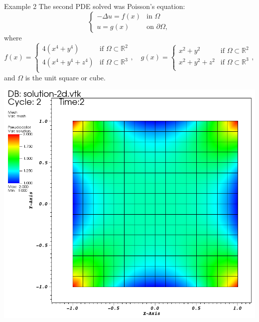 \documentclass[9pt]{beamer}
\newcommand{\Real}{\mathbb R}
\newcommand{\lap}{\Delta}
\begin{document}
\begin{frame}{Example 2}
The second PDE solved was Poisson's equation:
$$
\begin{cases}
-\lap u = f(x) &\text{in }\Omega\\
u = g(x) & \text{on }\partial\Omega,
\end{cases}
$$
where 
$$
f(x) = \begin{cases}
4(x^4 + y^4) & \text{if } \Omega \subset \Real^2\\
4(x^4 + y^4 + z^4) & \text{if } \Omega \subset \Real^3\\
\end{cases}, \quad 
g(x) = \begin{cases}
x^2 + y^2 & \text{if } \Omega \subset \Real^2\\
x^2 + y^2 + z^2 & \text{if } \Omega \subset \Real^3\\
\end{cases},
$$ and $\Omega$ is the unit square or cube.


\centering
\includegraphics[scale=.7]{Solu2-2d.png}
\end{frame}
\end{document}
